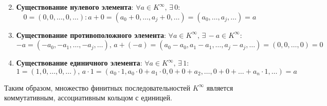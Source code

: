 \documentclass[12pt]{article}
\theoremstyle{definition}
\begin{document}
\begin{enumerate}[label=\arabic*)]
$$	$$
	\item \textbf{Существование нулевого элемента}: $\forall a \in K^{\infty},\, \exists \, 0$:
	$$
		 0 = (0, 0, \dotsc, 0,\dotsc) \colon a + 0 = (a_0 + 0, \dotsc, a_j + 0, \dotsc) = (a_0,\dotsc, a_j,\dotsc) = a
	$$
	\item \textbf{Существование противоположного элемента}: $\forall a \in K^{\infty},\, \exists \, -a \in K^{\infty}$:
	$$
		-a = (-a_0, -a_1, \dotsc, -a_j, \dotsc), \,  a +(-a) = (a_0 - a_0, a_1 - a_1,\dotsc, a_j - a_j, \dotsc) = (0,0,\dotsc, 0) = 0
	$$
	\item \textbf{Существование единичного элемента}: $\forall a \in K^{\infty}, \, \exists \, 1$:
	$$
		1 = (1, 0,\dotsc, 0, \dotsc), \, a{\cdot}1 = (a_0{\cdot}1, a_0{\cdot}0 + a_1{\cdot}0, 0 + 0 + a_2, \dotsc, 0 + 0+ \dotsc + a_n{\cdot}1, \dotsc) = a
	$$
\end{enumerate}
Таким образом, множество финитных последовательностей $K^{\infty}$ является коммутативным, ассоциативным кольцом с единицей.
\end{document}
